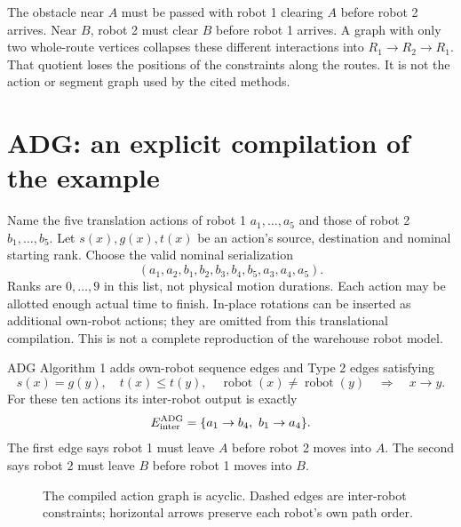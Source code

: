 \documentclass[11pt,a4paper]{article}
\begin{document}
The obstacle near $A$ must be passed with robot 1 clearing $A$ before robot 2
arrives. Near $B$, robot 2 must clear $B$ before robot 1 arrives. A graph with
only two whole-route vertices collapses these different interactions into
$R_1\to R_2\to R_1$. That quotient loses the positions of the constraints along
the routes. It is not the action or segment graph used by the cited methods.

\clearpage
\section{ADG: an explicit compilation of the example}
Name the five translation actions of robot 1 $a_1,\ldots,a_5$ and those of
robot 2 $b_1,\ldots,b_5$. Let $s(x),g(x),t(x)$ be an action's source,
destination and nominal starting rank. Choose the valid nominal serialization
\begin{equation}
(a_1,a_2,b_1,b_2,b_3,b_4,b_5,a_3,a_4,a_5).
\label{eq:rank}
\end{equation}
Ranks are $0,\ldots,9$ in this list, not physical motion durations. Each action
may be allotted enough actual time to finish. In-place rotations can be inserted
as additional own-robot actions; they are omitted from this translational
compilation. This is not a complete reproduction of the warehouse robot model.

ADG Algorithm 1 adds own-robot sequence edges and Type 2 edges satisfying
\begin{equation}
s(x)=g(y),\quad t(x)\le t(y),\quad \operatorname{robot}(x)\ne\operatorname{robot}(y)
\quad\Longrightarrow\quad x\to y.\label{eq:adg}
\end{equation}
For these ten actions its inter-robot output is exactly
\begin{equation}
E_{\rm inter}^{\rm ADG}=\{a_1\to b_4,\ b_1\to a_4\}.
\end{equation}
The first edge says robot 1 must leave $A$ before robot 2 moves into $A$.
The second says robot 2 must leave $B$ before robot 1 moves into $B$.

\begin{figure}[h]
\centering
{}
\caption{The compiled action graph is acyclic. Dashed edges are inter-robot
constraints; horizontal arrows preserve each robot's own path order.}
\end{figure}
\end{document}
